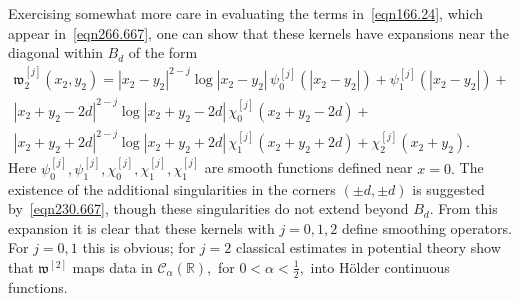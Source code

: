 \documentclass[11pt]{article}
\newcommand{\Bk}{\color{black}}
\newcommand{\Rd}{\color{black}}
\newcommand\fw{\mathfrak w}
\newcommand\cC{\mathcal{C}}
\newcommand\bbR{\mathbb R}
\theoremstyle{definition}
\theoremstyle{remark}
\begin{document}
   \Rd Exercising somewhat more care in evaluating the terms
   in~\eqref{eqn166.24}, which appear in~\eqref{eqn266.667}, one can show that
   these kernels have expansions near the diagonal within $B_d$ of the form
   \begin{multline}\label{eqn271.678}
     \fw^{[j]}_2(x_2,y_2)=|x_2-y_2|^{2-j}\log|x_2-y_2|\,\psi_0^{[j]}(|x_2-y_2|)+\psi_1^{[j]}(|x_2-y_2|)+\\
     |x_2+y_2-2d|^{2-j}\log|x_2+y_2-2d|\,\chi_0^{[j]}(x_2+y_2-2d)+\\
     |x_2+y_2+2d|^{2-j}\log|x_2+y_2+2d|\,\chi_1^{[j]}(x_2+y_2+2d)+\chi_2^{[j]}(x_2+y_2).
   \end{multline}
   Here $\psi_0^{[j]},\psi_1^{[j]},\chi_0^{[j]},\chi_1^{[j]},\chi_1^{[j]}$ are
   smooth functions defined near $x=0.$ The existence of the additional
   singularities in the corners $(\pm d,\pm d)$ is suggested
   by~\eqref{eqn230.667}, though these singularities do not extend beyond $B_d.$
   From this expansion it is clear that these kernels with $j=0,1,2$ define
   smoothing operators. For $j=0,1$ this is obvious; for $j=2$ classical
   estimates in potential theory show that $\fw^{[2]}$ maps data in
   $\cC_{\alpha}(\bbR),$ for $0<\alpha<\frac 12,$ into H\"older continuous
   functions.  \Bk
   
\end{document}
